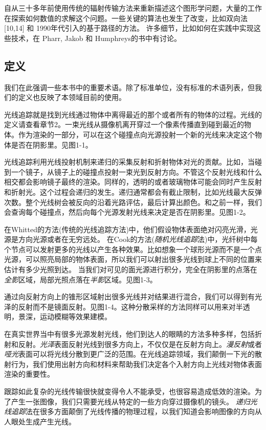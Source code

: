 \documentclass[12pt]{article}
\begin{document}
 自从三十多年前使用传统的辐射传输方法来重新描述这个图形学问题，大量的工作在探索如何数值的求解这个问题。一些关键的算法也发生了改变，比如双向法 [10,14] 和 1990年代引入的基于路径的方法。
许多细节，比如如何在实践中实现这些技术，在 Pharr, Jakob 和 Humphreys的书中有讨论。


\subsection{定义}
我们在此强调一些本书中的重要术语。除了标准单位，没有标准的术语列表，但我们的定义也反映了本领域目前的使用。
 
光线追踪就是找到光线通过物体中离得最近的那个或者所有的物体的过程。光线的定义请查看章节2。一束光线从摄像机离开穿过一个像素传播直到碰到最近的物体。作为渲染的一部分，可以在这个碰撞点向光源投射一个新的光线来决定这个物体是否在阴影里。见图1-1。
 
光线追踪利用光线投射机制来递归的采集反射和折射物体对光的贡献。比如，当碰到一个镜子，从镜子上的碰撞点投射一束光到反射方向。不管这个反射光线和什么相交都会影响镜子最终的渲染。同样的，透明的或者玻璃物体可能会同时产生反射和折射光。这个过程会递归的发生。递归通常都会有截止限制，比如光线最大反弹次数。整个光线树会被反向的沿着光路评估，最后计算出颜色。和之前一样，我们会查询每个碰撞点，然后向每个光源发射光线来决定是否在阴影里。见图1-2。

在Whitted的方法(传统的光线追踪方法)中，他们假设物体表面绝对闪亮光滑，光源是方向光源或者在无穷远处。 在Cook的方法(\textit{随机光线追踪}法)中，光纤树中每个节点可以发射更多的光线以产生各种效果。比如想象一个球形光源而不是一个点光源，可以照亮局部的物体表面，所以我们可以射出很多光线到球上不同的位置来估计有多少光照到达。 当我们对可见的面光源进行积分，完全在阴影里的点落在\textit{全影}区域，局部光照点落在\textit{半影}区域。见图1-3。

通过向反射方向上的锥形区域射出很多光线并对结果进行混合，我们可以得到有光泽的反射而不是镜面反射。见图1-4。这种分散采样的方法同样可以用来对半透明，景深，运动模糊等效果建模。

在真实世界当中有很多光源发射光线，他们到达人的眼睛的方法多种多样，包括折射和反射。\textit{光泽}表面反射光线到很多方向上，不仅仅是在反射方向上。\textit{漫反射}或者\textit{哑光}表面可以将光线分散到更广泛的范围。在光线追踪领域，我们颠倒一下光的散射行为，我们使用出射方向和材料来帮助我们决定各个入射方向上光线对物体表面渲染的重要性。

跟踪如此复杂的光线传输很快就变得令人不能承受，也很容易造成低效的渲染。为了产生一张图像，我们只需要光线从特定的一些方向穿过摄像机的镜头。 \textit{递归光线追踪}法在很多方面颠倒了光线传播的物理过程，以我们知道会影响图像的方向从人眼处生成产生光线。
\end{document}
